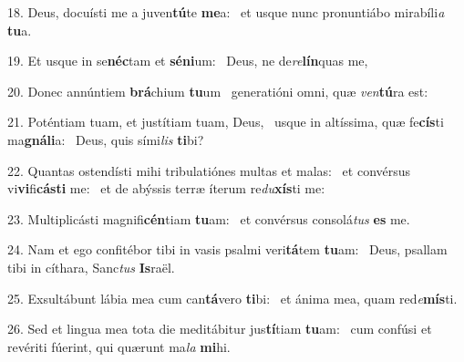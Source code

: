 18. Deus, docuísti me a juven\textbf{tú}te \textbf{me}a: \ast\  et usque nunc pronuntiábo mirabíli\textit{a} \textbf{tu}a.\

19. Et usque in se\textbf{néc}tam et \textbf{sé}\textbf{ni}um: \ast\  Deus, ne de\textit{re}\textbf{lín}quas me,\

20. Donec annúntiem \textbf{brá}chium \textbf{tu}um \ast\  generatióni omni, quæ \textit{ven}\textbf{tú}ra est:\

21. Poténtiam tuam, et justítiam tuam, Deus, \dag\  usque in altíssima, quæ fe\textbf{cís}ti ma\textbf{gná}\textbf{li}a: \ast\  Deus, quis sími\textit{lis} \textbf{ti}bi?\

22. Quantas ostendísti mihi tribulatiónes multas et malas: \dag\  et convérsus vi\textbf{vi}fi\textbf{cás}\textbf{ti} me: \ast\  et de abýssis terræ íterum re\textit{du}\textbf{xís}ti me:\

23. Multiplicásti magnifi\textbf{cén}tiam \textbf{tu}am: \ast\  et convérsus consolá\textit{tus} \textbf{es} me.\

24. Nam et ego confitébor tibi in vasis psalmi veri\textbf{tá}tem \textbf{tu}am: \ast\  Deus, psallam tibi in cíthara, Sanc\textit{tus} \textbf{Is}raël.\

25. Exsultábunt lábia mea cum can\textbf{tá}vero \textbf{ti}bi: \ast\  et ánima mea, quam red\textit{e}\textbf{mís}ti.\

26. Sed et lingua mea tota die meditábitur jus\textbf{tí}tiam \textbf{tu}am: \ast\  cum confúsi et revériti fúerint, qui quærunt ma\textit{la} \textbf{mi}hi.\

